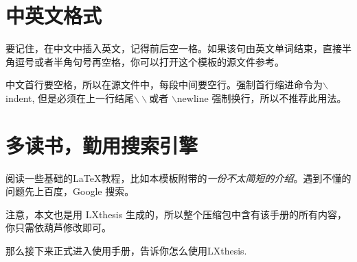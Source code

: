 \section{中英文格式}
要记住，在中文中插入英文，记得前后空一格。如果该句由英文单词结束，直接半角逗号或者半角句号再空格，你可以打开这个模板的源文件参考。

中文首行要空格，所以在源文件中，每段中间要空行。强制首行缩进命令为$\backslash$indent, 但是必须在上一行结尾$\backslash\backslash$或者 $\backslash$newline 强制换行，所以不推荐此用法。

\section{多读书，勤用搜索引擎}
阅读一些基础的\LaTeX 教程，比如本模板附带的\emph{一份不太简短的\LaTeXe 介绍}。遇到不懂的问题先上百度，Google 搜索。

注意，本文也是用 LXthesis 生成的，所以整个压缩包中含有该手册的所有内容，你只需依葫芦修改即可。

那么接下来正式进入使用手册，告诉你怎么使用LXthesis. 